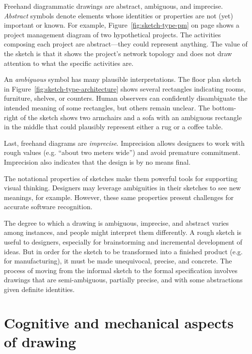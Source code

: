 Freehand diagrammatic drawings are abstract, ambiguous, and
imprecise. \textit{Abstract} symbols denote elements whose identities
or properties are not (yet) important or known. For example,
Figure~\ref{fig:sketch-type-pm} on page \pageref{fig:sketch-type-pm}
shows a project management diagram of two hypothetical projects. The
activities composing each project are abstract---they could represent
anything. The value of the sketch is that it shows the project's
network topology and does not draw attention to what the specific
activities are. 

An \textit{ambiguous} symbol has many plausible interpretations. The
floor plan sketch in Figure~\ref{fig:sketch-type-architecture} shows
several rectangles indicating rooms, furniture, shelves, or
counters. Human observers can confidently disambiguate the intended
meaning of some rectangles, but others remain unclear. The
bottom-right of the sketch shows two armchairs and a sofa with an
ambiguous rectangle in the middle that could plausibly represent
either a rug or a coffee table.

Last, freehand diagrams are \textit{imprecise}. Imprecision allows
designers to work with rough values (e.g. ``about two meters wide'')
and avoid premature commitment. Imprecision also indicates that the
design is by no means final.

The notational properties of sketches make them powerful tools for
supporting visual thinking. Designers may leverage ambiguities in
their sketches to see new meanings, for example. However, these same
properties present challenges for accurate software recognition.

The degree to which a drawing is ambiguous, imprecise, and abstract
varies among instances, and people might interpret them differently. A
rough sketch is useful to designers, especially for brainstorming and
incremental development of ideas. But in order for the sketch to be
transformed into a finished product (e.g. for manufacturing), it must
be made unequivocal, precise, and concrete. The process of moving from
the informal sketch to the formal specification involves drawings that
are semi-ambiguous, partially precise, and with some abstractions
given definite identities.

\section{Cognitive and mechanical aspects of drawing}
\label{sec:traditional-cognitive-mechanical}

